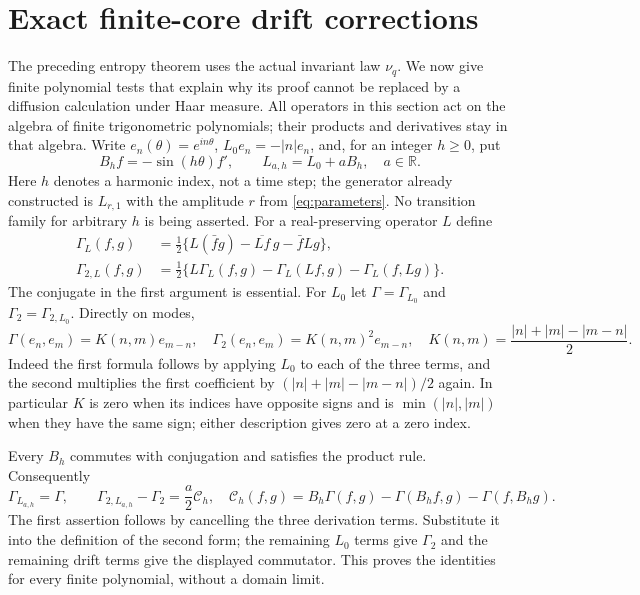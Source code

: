 \documentclass[11pt]{article}
\newcommand{\R}{\mathbb R}\newcommand{\C}{\mathbb C}
\begin{document}
\section{Exact finite-core drift corrections}
The preceding entropy theorem uses the actual invariant law $\nu_q$.
We now give finite polynomial tests that explain why its proof cannot
be replaced by a diffusion calculation under Haar measure. All
operators in this section act on the algebra of finite trigonometric
polynomials; their products and derivatives stay in that algebra.
Write $e_n(\theta)=e^{in\theta}$, $L_0e_n=-|n|e_n$, and, for an
integer $h\geq0$, put
\[
 B_hf=-\sin(h\theta)f',\qquad L_{a,h}=L_0+aB_h,\quad a\in\R.
\]
Here $h$ denotes a harmonic index, not a time step; the generator
already constructed is $L_{r,1}$ with the amplitude $r$ from
\eqref{eq:parameters}. No transition family for arbitrary $h$ is
being asserted. For a real-preserving operator $L$ define
\begin{align*}
 \Gamma_L(f,g)&=\tfrac12\{L(\bar f g)-\overline{Lf}\,g-\bar f Lg\},\\
 \Gamma_{2,L}(f,g)&=\tfrac12\{L\Gamma_L(f,g)
 -\Gamma_L(Lf,g)-\Gamma_L(f,Lg)\}.
\end{align*}
The conjugate in the first argument is essential. For $L_0$ let
$\Gamma=\Gamma_{L_0}$ and $\Gamma_2=\Gamma_{2,L_0}$. Directly on modes,
\begin{equation}\label{eq:cauchykernel}
 \Gamma(e_n,e_m)=K(n,m)e_{m-n},\quad
 \Gamma_2(e_n,e_m)=K(n,m)^2e_{m-n},\quad
 K(n,m)=\frac{|n|+|m|-|m-n|}{2}.
\end{equation}
Indeed the first formula follows by applying $L_0$ to each of the
three terms, and the second multiplies the first coefficient by
$(|n|+|m|-|m-n|)/2$ again. In particular $K$ is zero when its
indices have opposite signs and is $\min(|n|,|m|)$ when they have
the same sign; either description gives zero at a zero index.

Every $B_h$ commutes with conjugation and satisfies the product
rule. Consequently
\begin{equation}\label{eq:driftcommutator}
 \Gamma_{L_{a,h}}=\Gamma,\qquad
 \Gamma_{2,L_{a,h}}-\Gamma_2=\frac a2\mathcal C_h,
 \quad
 \mathcal C_h(f,g)=B_h\Gamma(f,g)-\Gamma(B_hf,g)-\Gamma(f,B_hg).
\end{equation}
The first assertion follows by cancelling the three derivation
terms. Substitute it into the definition of the second form;
the remaining $L_0$ terms give $\Gamma_2$ and the remaining drift
terms give the displayed commutator. This proves the identities
for every finite polynomial, without a domain limit.
\end{document}

